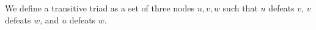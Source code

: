 \documentclass[preview]{standalone}
\begin{document}
We define a transitive triad as a set of three nodes $u, v, w$ such that $u$ defeats $v$, $v$ defeats $w$, and $u$ defeats $w$.\\
\end{document}

